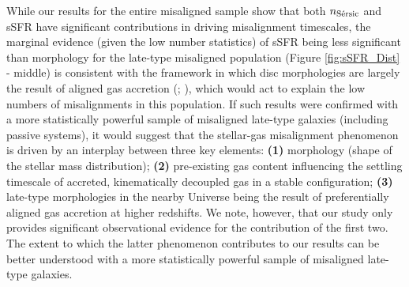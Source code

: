 \documentclass[fleqn,usenatbib]{mnras}
\begin{document}
While our results for the entire misaligned sample show that both $n_{\rm{S\Acute{e}rsic}}$ and sSFR have significant contributions in driving misalignment timescales, the marginal evidence (given the low number statistics) of sSFR being less significant than morphology for the late-type misaligned population (Figure \ref{fig:sSFR_Dist} - middle) is consistent with the framework in which disc morphologies are largely the result of aligned gas accretion (\citealt{Sales2012}; \citealt{Welker2017}), which would act to explain the low numbers of misalignments in this population. If such results were confirmed with a more statistically powerful sample of misaligned late-type galaxies (including passive systems), it would suggest that the stellar-gas misalignment phenomenon is driven by an interplay between three key elements: \textbf{(1)} morphology (shape of the stellar mass distribution); \textbf{(2)} pre-existing gas content influencing the settling timescale of accreted, kinematically decoupled gas in a stable configuration; \textbf{(3)} late-type morphologies in the nearby Universe being the result of preferentially aligned gas accretion at higher redshifts. We note, however, that our study only provides significant observational evidence for the contribution of the first two. The extent to which the latter phenomenon contributes to our results can be better understood with a more statistically powerful sample of misaligned late-type galaxies.
\end{document}
